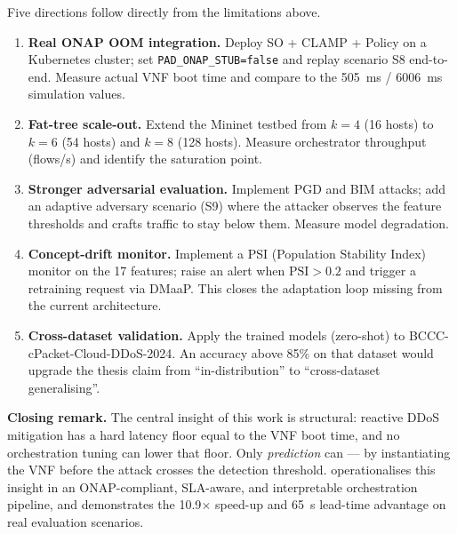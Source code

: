 Five directions follow directly from the limitations above.

\begin{enumerate}
  \item \textbf{Real ONAP OOM integration.} Deploy SO + CLAMP + Policy
        on a Kubernetes cluster; set \texttt{PAD\_ONAP\_STUB=false}
        and replay scenario S8 end-to-end. Measure actual VNF boot time
        and compare to the 505~ms / 6006~ms simulation values.

  \item \textbf{Fat-tree scale-out.} Extend the Mininet testbed from
        $k{=}4$ (16 hosts) to $k{=}6$ (54 hosts) and $k{=}8$
        (128 hosts). Measure orchestrator throughput (flows/s) and
        identify the saturation point.

  \item \textbf{Stronger adversarial evaluation.} Implement PGD and
        BIM attacks; add an adaptive adversary scenario (S9) where
        the attacker observes the feature thresholds and crafts
        traffic to stay below them. Measure model degradation.

  \item \textbf{Concept-drift monitor.} Implement a PSI
        (Population Stability Index) monitor on the 17 features;
        raise an alert when $\text{PSI} > 0.2$ and trigger a
        retraining request via DMaaP. This closes the adaptation
        loop missing from the current architecture.

  \item \textbf{Cross-dataset validation.} Apply the trained models
        (zero-shot) to BCCC-cPacket-Cloud-DDoS-2024. An accuracy
        above 85\% on that dataset would upgrade the thesis claim
        from ``in-distribution'' to ``cross-dataset generalising''.
\end{enumerate}

\medskip
\noindent\textbf{Closing remark.}
The central insight of this work is structural: reactive DDoS
mitigation has a hard latency floor equal to the VNF boot time, and
no orchestration tuning can lower that floor. Only \emph{prediction}
can --- by instantiating the VNF before the attack crosses the
detection threshold. \padonap{} operationalises this insight in an
ONAP-compliant, SLA-aware, and interpretable orchestration pipeline,
and demonstrates the 10.9$\times$ speed-up and 65~s lead-time
advantage on real evaluation scenarios.
